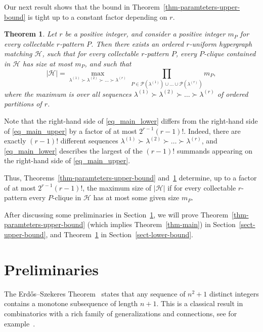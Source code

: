\documentclass[11pt]{article}
\newtheorem{theorem}{Theorem}[section]
\theoremstyle{definition}
\numberwithin{equation}{section}
\numberwithin{figure}{section}
\newcommand{\HH}{\mathcal{H}}
\newcommand{\PP}{\mathcal{P}}
\begin{document}
Our next result shows that the bound in Theorem~\ref{thm-paramteters-upper-bound} is tight up to a constant factor depending on $r$.

\begin{theorem} \label{thm-paramteters-lower-bound}
Let $r$ be a positive integer, and consider a positive integer $m_P$ for every collectable $r$-pattern $P$. Then there exists an  ordered $r$-uniform hypergraph matching $\HH$, such that for every collectable $r$-pattern $P$, every $P$-clique contained in $\HH$ has size at most $m_P$, and such that
\begin{equation}\label{eq_main_lower}
|\HH|= \max_{\lambda^{(1)} \succ \lambda^{(2)} \succ \dots \succ \lambda^{(r)}}\ \prod_{P\in \PP(\lambda^{(1)})\cup\dots\cup \PP(\lambda^{(r)})} m_{P},
\end{equation}
where the maximum is over all sequences $\lambda^{(1)} \succ \lambda^{(2)} \succ \dots \succ \lambda^{(r)}$ of ordered partitions of $r$.
\end{theorem}

Note that the right-hand side of \eqref{eq_main_lower} differs from the right-hand side of \eqref{eq_main_upper} by a factor of at most $2^{r-1}(r-1)!$. Indeed, there are exactly $(r-1)!$ different sequences $\lambda^{(1)} \succ \lambda^{(2)} \succ \dots \succ \lambda^{(r)}$, and \eqref{eq_main_lower} describes the largest of the $(r-1)!$ summands appearing on the right-hand side of \eqref{eq_main_upper}.

Thus, Theorems~\ref{thm-paramteters-upper-bound} and~\ref{thm-paramteters-lower-bound} determine, up to a factor of at most $2^{r-1}(r-1)!$, the maximum size of $|\HH|$ if for every collectable $r$-pattern every $P$-clique in $\HH$ has at most some given size $m_P$.

After discussing some preliminaries in Section~\ref{sect-preliminaries}, we will prove Theorem~\ref{thm-paramteters-upper-bound} (which implies Theorem~\ref{thm-main}) in Section~\ref{sect-upper-bound}, and Theorem~\ref{thm-paramteters-lower-bound} in Section~\ref{sect-lower-bound}.

\section{Preliminaries}
\label{sect-preliminaries}

The Erd\H{o}s--Szekeres Theorem~\cite{ES} states that any sequence of $n^2+1$ distinct integers contains a monotone subsequence of length $n+1$. This is a classical result in combinatorics with a rich family of generalizations and connections, see for example~\cite{ExpES,GL,LS,MS,ST}.
\end{document}
